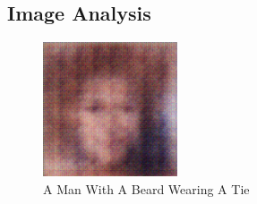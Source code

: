 \documentclass{article}%
\begin{document}
%
\subsection{Image Analysis}%
\label{subsec:ImageAnalysis}%


\begin{figure}[h!]%
\centering%
\includegraphics[width=150px]{500_fake_images/samples_5_361.png}%
\caption{A Man With A Beard Wearing A Tie}%
\end{figure}

%
\end{document}
